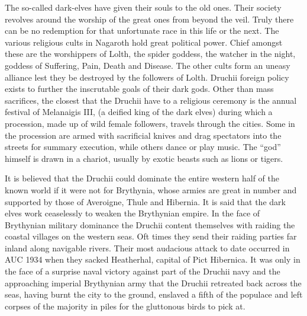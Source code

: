 \documentclass[a4paper]{dnd5}
\begin{document}
The so-called dark-elves have given their souls to the old ones.  Their society revolves around the worship of the great ones from beyond the veil.  Truly there can be no redemption for that unfortunate race in this life or the next.  The various religious cults in Nagaroth hold great political power.  Chief amongst these are the worshippers of Lolth, the spider goddess, the watcher in the night, goddess of Suffering, Pain, Death and Disease.  The other cults form an uneasy alliance lest they be destroyed by the followers of Lolth.  Druchii foreign policy exists to further the inscrutable goals of their dark gods.  Other than mass sacrifices, the closest that the Druchii have to a religious ceremony is the annual festival of Melanaigis III, (a deified king of the dark elves) during which a procession, made up of wild female followers, travels through the cities. Some in the procession are armed with sacrificial knives and drag spectators into the streets for summary execution, while others dance or play music. The ``god'' himself is drawn in a chariot, usually by exotic beasts such as lions or tigers. 

It is believed that the Druchii could dominate the entire western half of the known world if it were not for Brythynia, whose armies are great in number and supported by those of Averoigne, Thule and Hibernia. It is said that the dark elves work ceaselessly to weaken the Brythynian empire.  In the face of Brythynian military dominance the Druchii content themselves with raiding the coastal villages on the western seas.  Oft times they send their raiding parties far inland along navigable rivers.  Their most audacious attack to date occurred in AUC 1934 when they sacked Heatherhal, capital of Pict Hibernica.  It was only in the face of a surprise naval victory against part of the Druchii navy and the approaching imperial Brythynian army that the Druchii retreated back across the seas, having burnt the city to the ground, enslaved a fifth of the populace and left corpses of the majority in piles for the gluttonous birds to pick at.  
\end{document}
